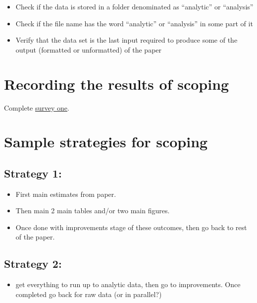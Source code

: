 \documentclass[]{book}
\providecommand{\tightlist}{%
  \setlength{\itemsep}{0pt}\setlength{\parskip}{0pt}}
\begin{document}
\begin{itemize}
\tightlist
\item
  Check if the data is stored in a folder denominated as ``analytic'' or ``analysis''\\
\item
  Check if the file name has the word ``analytic'' or ``analysis'' in some part of it\\
\item
  Verify that the data set is the last input required to produce some of the output (formatted or unformatted) of the paper
\end{itemize}

\hypertarget{recording-the-results-of-scoping}{%
\section{Recording the results of scoping}\label{recording-the-results-of-scoping}}

Complete \href{https://berkeley.qualtrics.com/jfe/form/SV_8hLHNI6LGSYchEN}{survey one}.

\hypertarget{sample-strategies-for-scoping}{%
\section{Sample strategies for scoping}\label{sample-strategies-for-scoping}}

\hypertarget{strategy-1}{%
\subsection{Strategy 1:}\label{strategy-1}}

\begin{itemize}
\item
  First main estimates from paper.
\item
  Then main 2 main tables and/or two main figures.
\item
  Once done with improvements stage of these outcomes, then go back to rest of the paper.
\end{itemize}

\hypertarget{strategy-2}{%
\subsection{Strategy 2:}\label{strategy-2}}

\begin{itemize}
\tightlist
\item
  get everything to run up to analytic data, then go to improvements. Once completed go back for raw data (or in parallel?)
\end{itemize}
\end{document}
